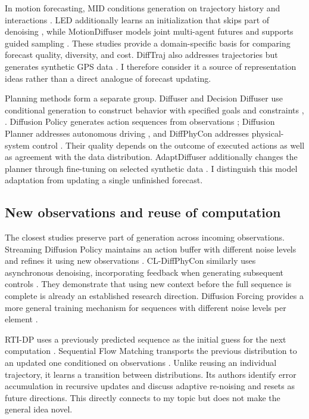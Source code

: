 \documentclass{article}
\begin{document}
In motion forecasting, MID conditions generation on trajectory history and interactions \citep{p09}. LED additionally learns an initialization that skips part of denoising \citep{p10}, while MotionDiffuser models joint multi-agent futures and supports guided sampling \citep{p11}. These studies provide a domain-specific basis for comparing forecast quality, diversity, and cost. DiffTraj also addresses trajectories but generates synthetic GPS data \citep{p12}. I therefore consider it a source of representation ideas rather than a direct analogue of forecast updating.

Planning methods form a separate group. Diffuser and Decision Diffuser use conditional generation to construct behavior with specified goals and constraints \citep{p14}, \citep{p15}. Diffusion Policy generates action sequences from observations \citep{p17}; Diffusion Planner addresses autonomous driving \citep{p13}, and DiffPhyCon addresses physical-system control \citep{p18}. Their quality depends on the outcome of executed actions as well as agreement with the data distribution. AdaptDiffuser additionally changes the planner through fine-tuning on selected synthetic data \citep{p16}. I distinguish this model adaptation from updating a single unfinished forecast.

\subsection{New observations and reuse of computation}

The closest studies preserve part of generation across incoming observations. Streaming Diffusion Policy maintains an action buffer with different noise levels and refines it using new observations \citep{p01}. CL-DiffPhyCon similarly uses asynchronous denoising, incorporating feedback when generating subsequent controls \citep{p02}. They demonstrate that using new context before the full sequence is complete is already an established research direction. Diffusion Forcing provides a more general training mechanism for sequences with different noise levels per element \citep{p05}.

RTI-DP uses a previously predicted sequence as the initial guess for the next computation \citep{p04}. Sequential Flow Matching transports the previous distribution to an updated one conditioned on observations \citep{p03}. Unlike reusing an individual trajectory, it learns a transition between distributions. Its authors identify error accumulation in recursive updates and discuss adaptive re-noising and resets as future directions. This directly connects to my topic but does not make the general idea novel.
\end{document}
